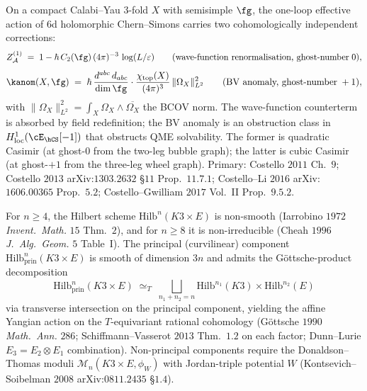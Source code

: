 \begin{theorem}
\label{wn:thm:wave3-CoHA-anomaly}\ClaimStatusTheorem
On a compact Calabi--Yau $3$-fold $X$ with semisimple $\fg$, the
one-loop effective action of $6$d holomorphic Chern--Simons carries
two cohomologically independent corrections:
\[
Z^{(1)}_{\mathcal{A}} \;=\; 1 - \hbar\, C_2(\fg)\, (4\pi)^{-3}\,
\log(L/\varepsilon)
\qquad\text{(wave-function renormalisation, ghost-number}\;0\text{)},
\]
\[
\kanom(X, \fg) \;=\; \hbar\,
\frac{d^{abc}\, d_{abc}}{\dim\fg} \cdot
\frac{\chi_{\mathrm{top}}(X)}{(4\pi)^3}\,
\|\Omega_X\|^2_{L^2}
\qquad\text{(BV anomaly, ghost-number}\;+1\text{)},
\]
with $\|\Omega_X\|^2_{L^2} = \int_X \Omega_X \wedge \overline{\Omega_X}$
the BCOV norm. The wave-function counterterm is absorbed by field
redefinition; the BV anomaly is an obstruction class in
$H^1_{\mathrm{loc}}(\cE_{\hCS}[-1])$ that obstructs QME solvability.
The former is quadratic Casimir (at ghost-$0$ from the two-leg bubble
graph); the latter is cubic Casimir (at ghost-$+1$ from the three-leg
wheel graph). Primary: Costello $2011$ Ch.~$9$; Costello $2013$
arXiv:$1303.2632$ \S$11$ Prop.~$11.7.1$;
Costello--Li $2016$ arXiv:$1606.00365$ Prop.~$5.2$;
Costello--Gwilliam $2017$ Vol.~II Prop.~$9.5.2$.
\end{theorem}

\begin{theorem}
\label{wn:thm:wave3-hilb-principal}\ClaimStatusTheorem
For $n \geq 4$, the Hilbert scheme $\mathrm{Hilb}^n(K3 \times E)$ is
non-smooth (Iarrobino $1972$ \emph{Invent.~Math.} $15$ Thm.~$2$), and
for $n \geq 8$ it is non-irreducible (Cheah $1996$ \emph{J.~Alg.~Geom.}
$5$ Table~I). The principal (curvilinear) component
$\mathrm{Hilb}^n_{\mathrm{prin}}(K3 \times E)$ is smooth of dimension
$3n$ and admits the Göttsche-product decomposition
\[
\mathrm{Hilb}^n_{\mathrm{prin}}(K3 \times E)
\;\simeq_{T}\;
\bigsqcup_{n_1 + n_2 = n}
\mathrm{Hilb}^{n_1}(K3) \times \mathrm{Hilb}^{n_2}(E)
\]
via transverse intersection on the principal component, yielding the
affine Yangian action on the $T$-equivariant rational cohomology
(Göttsche $1990$ \emph{Math.~Ann.} $286$; Schiffmann--Vasserot $2013$
Thm.~$1.2$ on each factor; Dunn--Lurie $E_3 = E_2 \otimes E_1$
combination). Non-principal components require the
Donaldson--Thomas moduli $\mathcal{M}_n(K3 \times E, \phi_W)$ with
Jordan-triple potential $W$ (Kontsevich--Soibelman $2008$
arXiv:$0811.2435$ \S$1.4$).
\end{theorem}

